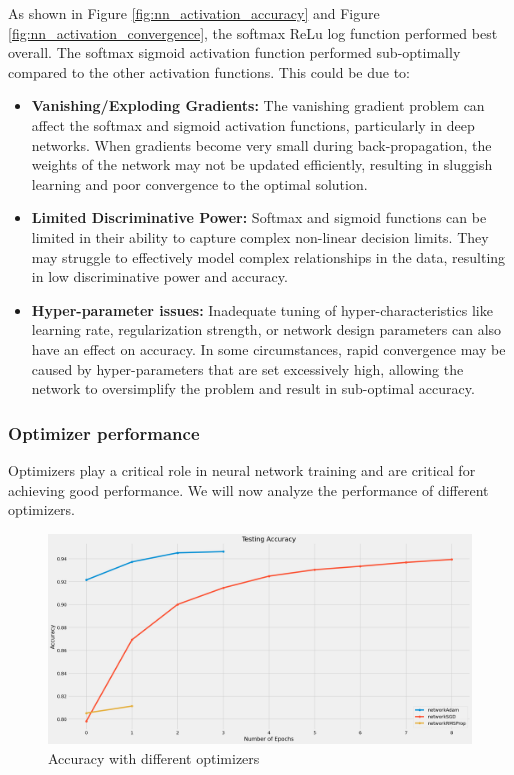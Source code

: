 \documentclass[a4paper,twoside,10pt]{article}
\begin{document}
As shown in Figure \ref{fig:nn_activation_accuracy} and Figure \ref{fig:nn_activation_convergence}, the softmax ReLu log function performed best overall. The softmax sigmoid activation function performed sub-optimally compared to the other activation functions. This could be due to:

\begin{itemize}
    \item \textbf{Vanishing/Exploding Gradients:} The vanishing gradient problem can affect the softmax and sigmoid activation functions, particularly in deep networks. When gradients become very small during back-propagation, the weights of the network may not be updated efficiently, resulting in sluggish learning and poor convergence to the optimal solution.

    \item \textbf{Limited Discriminative Power:} Softmax and sigmoid functions can be limited in their ability to capture complex non-linear decision limits. They may struggle to effectively model complex relationships in the data, resulting in low discriminative power and accuracy.

    \item \textbf{Hyper-parameter issues:} Inadequate tuning of hyper-characteristics like learning rate, regularization strength, or network design parameters can also have an effect on accuracy. In some circumstances, rapid convergence may be caused by hyper-parameters that are set excessively high, allowing the network to oversimplify the problem and result in sub-optimal accuracy.
\end{itemize}

\subsubsection{Optimizer performance}
Optimizers play a critical role in neural network training and are critical for achieving good performance. We will now analyze the performance of different optimizers.

\begin{figure}[H]
    \centering
    \includegraphics[scale=0.3]{Optimizers Accuracy}
    \caption{Accuracy with different optimizers}
    \label{fig:nn_optimizer_accuracy}
\end{figure}
\end{document}
